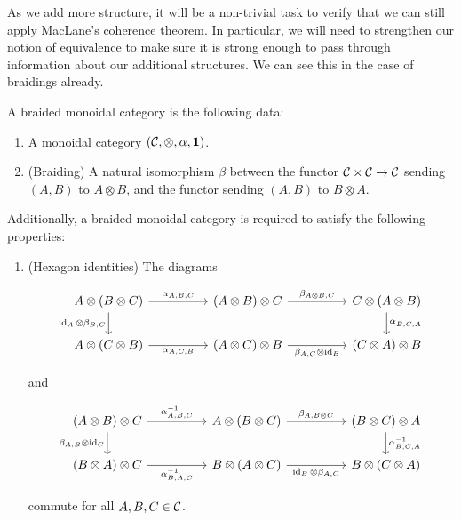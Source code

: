 As we add more structure, it will be a non-trivial task to verify that we can still apply MacLane's coherence theorem. In particular, we will need to strengthen our notion of equivalence to make sure it is strong enough to pass through information about our additional structures. We can see this in the case of braidings already.

\begin{defn} A braided monoidal category is the following data:

\begin{enumerate}
\item A monoidal category $({\mathcal C},\otimes,\alpha, {\mathbf 1})$.
\item (Braiding) A natural isomorphism $\beta$ between the functor ${\mathcal C}\times {\mathcal C}\to {\mathcal C}$ sending $(A,B)$ to $A\otimes B$, and the functor sending $(A,B)$ to $B\otimes A$.
\end{enumerate}

Additionally, a braided monoidal category is required to satisfy the following properties:

\begin{enumerate}
\item (Hexagon identities) The diagrams

\[\begin{tikzcd}
	{A\otimes (B\otimes C)} && {(A\otimes B)\otimes C} && {C\otimes (A\otimes B)} \\
	{A\otimes (C\otimes B)} && {(A\otimes C)\otimes B} && {(C\otimes A)\otimes B}
	\arrow["{\alpha_{A,B,C}}", from=1-1, to=1-3]
	\arrow["{\beta_{A\otimes B,C}}", from=1-3, to=1-5]
	\arrow["{\alpha^{}_{B,C,A}}", from=1-5, to=2-5]
	\arrow["{\id_A\otimes \beta_{B,C}}"', from=1-1, to=2-1]
	\arrow["{\alpha_{A,C,B}}"', from=2-1, to=2-3]
	\arrow["{\beta_{A,C}\otimes \id_B}"', from=2-3, to=2-5]
\end{tikzcd}\]

and

\[\begin{tikzcd}
	{(A\otimes B)\otimes C} && {A\otimes (B\otimes C)} && {(B\otimes C)\otimes A} \\
	{(B\otimes A)\otimes C} && {B\otimes (A\otimes C)} && {B\otimes (C\otimes A)}
	\arrow["{\alpha^{-1}_{A,B,C}}", from=1-1, to=1-3]
	\arrow["{\beta_{A,B\otimes C}}", from=1-3, to=1-5]
	\arrow["{\alpha^{-1}_{B,C,A}}", from=1-5, to=2-5]
	\arrow["{\beta_{A,B}\otimes \id_C}"', from=1-1, to=2-1]
	\arrow["{\alpha^{-1}_{B,A,C}}"', from=2-1, to=2-3]
	\arrow["{\id_B\otimes \beta_{A,C}}"', from=2-3, to=2-5]
\end{tikzcd}\]

commute for all $A,B,C\in {\mathcal C}$.
\end{enumerate}

\raggedleft\qedsymbol{}
\end{defn}

